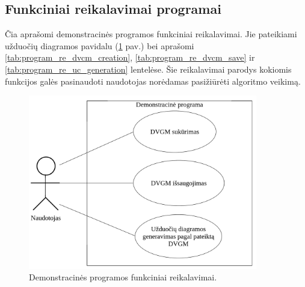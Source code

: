 \subsection{Funkciniai reikalavimai programai}

Čia aprašomi demonstracinės programos funkciniai reikalavimai. Jie pateikiami užduočių diagramos pavidalu (\ref{img:program_functional_requirements} pav.) bei aprašomi \ref{tab:program_re_dvcm_creation}, \ref{tab:program_re_dvcm_save} ir \ref{tab:program_re_uc_generation} lentelėse. Šie reikalavimai parodys kokiomis funkcijos galės pasinaudoti naudotojas norėdamas pasižiūrėti algoritmo veikimą.

\begin{figure}[H]
	\centering
	\includegraphics[width=10cm]{sections/prototype_app/img/program_functional_requirements}
	\caption{Demonstracinės programos funkciniai reikalavimai.}
	\label{img:program_functional_requirements}
\end{figure}

